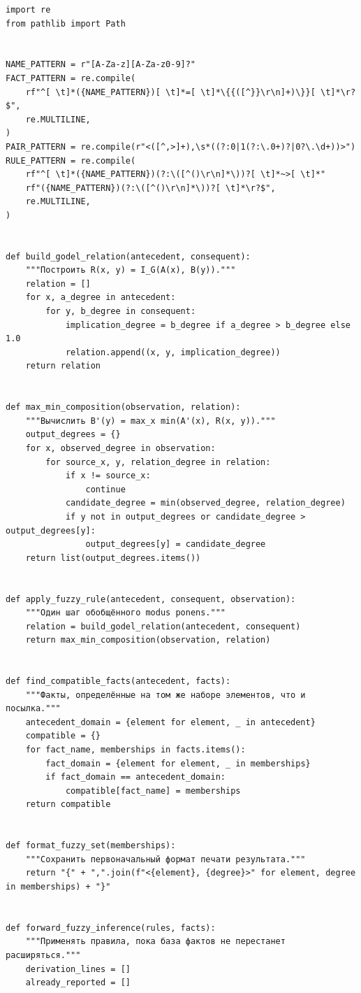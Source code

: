\documentclass[14pt,a4paper]{extarticle}
\begin{document}
\begin{Verbatim}[fontsize=\small,frame=single,breaklines=true]
import re
from pathlib import Path


NAME_PATTERN = r"[A-Za-z][A-Za-z0-9]?"
FACT_PATTERN = re.compile(
    rf"^[ \t]*({NAME_PATTERN})[ \t]*=[ \t]*\{{([^}}\r\n]+)\}}[ \t]*\r?$",
    re.MULTILINE,
)
PAIR_PATTERN = re.compile(r"<([^,>]+),\s*((?:0|1(?:\.0+)?|0?\.\d+))>")
RULE_PATTERN = re.compile(
    rf"^[ \t]*({NAME_PATTERN})(?:\([^()\r\n]*\))?[ \t]*~>[ \t]*"
    rf"({NAME_PATTERN})(?:\([^()\r\n]*\))?[ \t]*\r?$",
    re.MULTILINE,
)


def build_godel_relation(antecedent, consequent):
    """Построить R(x, y) = I_G(A(x), B(y))."""
    relation = []
    for x, a_degree in antecedent:
        for y, b_degree in consequent:
            implication_degree = b_degree if a_degree > b_degree else 1.0
            relation.append((x, y, implication_degree))
    return relation


def max_min_composition(observation, relation):
    """Вычислить B'(y) = max_x min(A'(x), R(x, y))."""
    output_degrees = {}
    for x, observed_degree in observation:
        for source_x, y, relation_degree in relation:
            if x != source_x:
                continue
            candidate_degree = min(observed_degree, relation_degree)
            if y not in output_degrees or candidate_degree > output_degrees[y]:
                output_degrees[y] = candidate_degree
    return list(output_degrees.items())


def apply_fuzzy_rule(antecedent, consequent, observation):
    """Один шаг обобщённого modus ponens."""
    relation = build_godel_relation(antecedent, consequent)
    return max_min_composition(observation, relation)


def find_compatible_facts(antecedent, facts):
    """Факты, определённые на том же наборе элементов, что и посылка."""
    antecedent_domain = {element for element, _ in antecedent}
    compatible = {}
    for fact_name, memberships in facts.items():
        fact_domain = {element for element, _ in memberships}
        if fact_domain == antecedent_domain:
            compatible[fact_name] = memberships
    return compatible


def format_fuzzy_set(memberships):
    """Сохранить первоначальный формат печати результата."""
    return "{" + ",".join(f"<{element}, {degree}>" for element, degree in memberships) + "}"


def forward_fuzzy_inference(rules, facts):
    """Применять правила, пока база фактов не перестанет расширяться."""
    derivation_lines = []
    already_reported = []


\end{Verbatim}
\end{document}
